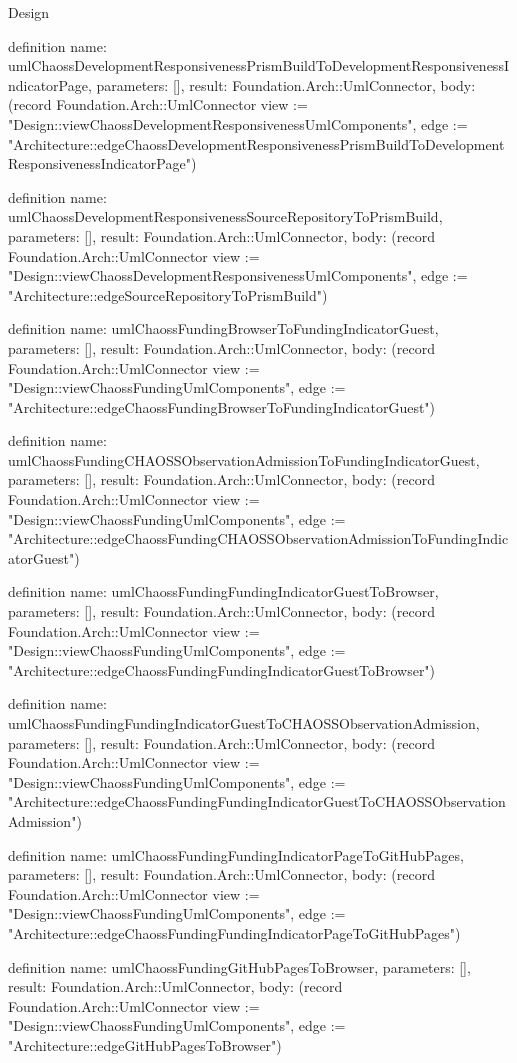 \begin{lexlean}{Design}
\begin{semanticmodule}
definition{
  name: umlChaossDevelopmentResponsivenessPrismBuildToDevelopmentResponsivenessIndicatorPage,
  parameters: [],
  result: Foundation.Arch::UmlConnector,
  body: (record Foundation.Arch::UmlConnector {view := "Design::viewChaossDevelopmentResponsivenessUmlComponents", edge := "Architecture::edgeChaossDevelopmentResponsivenessPrismBuildToDevelopmentResponsivenessIndicatorPage"})
}

definition{
  name: umlChaossDevelopmentResponsivenessSourceRepositoryToPrismBuild,
  parameters: [],
  result: Foundation.Arch::UmlConnector,
  body: (record Foundation.Arch::UmlConnector {view := "Design::viewChaossDevelopmentResponsivenessUmlComponents", edge := "Architecture::edgeSourceRepositoryToPrismBuild"})
}

definition{
  name: umlChaossFundingBrowserToFundingIndicatorGuest,
  parameters: [],
  result: Foundation.Arch::UmlConnector,
  body: (record Foundation.Arch::UmlConnector {view := "Design::viewChaossFundingUmlComponents", edge := "Architecture::edgeChaossFundingBrowserToFundingIndicatorGuest"})
}

definition{
  name: umlChaossFundingCHAOSSObservationAdmissionToFundingIndicatorGuest,
  parameters: [],
  result: Foundation.Arch::UmlConnector,
  body: (record Foundation.Arch::UmlConnector {view := "Design::viewChaossFundingUmlComponents", edge := "Architecture::edgeChaossFundingCHAOSSObservationAdmissionToFundingIndicatorGuest"})
}

definition{
  name: umlChaossFundingFundingIndicatorGuestToBrowser,
  parameters: [],
  result: Foundation.Arch::UmlConnector,
  body: (record Foundation.Arch::UmlConnector {view := "Design::viewChaossFundingUmlComponents", edge := "Architecture::edgeChaossFundingFundingIndicatorGuestToBrowser"})
}

definition{
  name: umlChaossFundingFundingIndicatorGuestToCHAOSSObservationAdmission,
  parameters: [],
  result: Foundation.Arch::UmlConnector,
  body: (record Foundation.Arch::UmlConnector {view := "Design::viewChaossFundingUmlComponents", edge := "Architecture::edgeChaossFundingFundingIndicatorGuestToCHAOSSObservationAdmission"})
}

definition{
  name: umlChaossFundingFundingIndicatorPageToGitHubPages,
  parameters: [],
  result: Foundation.Arch::UmlConnector,
  body: (record Foundation.Arch::UmlConnector {view := "Design::viewChaossFundingUmlComponents", edge := "Architecture::edgeChaossFundingFundingIndicatorPageToGitHubPages"})
}

definition{
  name: umlChaossFundingGitHubPagesToBrowser,
  parameters: [],
  result: Foundation.Arch::UmlConnector,
  body: (record Foundation.Arch::UmlConnector {view := "Design::viewChaossFundingUmlComponents", edge := "Architecture::edgeGitHubPagesToBrowser"})
}


\end{semanticmodule}
\end{lexlean}
